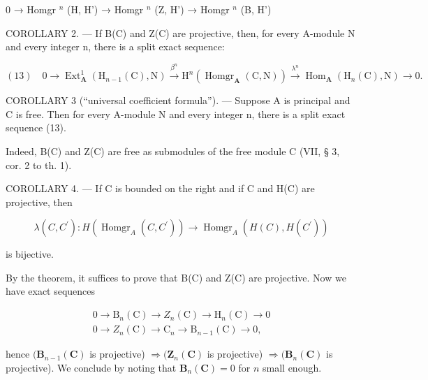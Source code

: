 0 → Homgr \(^{n}\) (H, H') → Homgr \(^{n}\) (Z, H') → Homgr \(^{n}\) (B, H')

COROLLARY 2. --- If B(C) and Z(C) are projective, then, for every A-module N and every integer n, there is a split exact sequence:

\[
(1 3) \quad 0 \longrightarrow \operatorname{Ext} _ {\mathbf {A}} ^ {1} \left(\mathrm{H} _ {n - 1} (\mathrm{C}), \mathrm{N}\right) \xrightarrow {\beta^ {n}} \mathrm{H} ^ {n} \left(\operatorname{Homgr} _ {\mathbf {A}} (\mathrm{C}, \mathrm{N})\right) \xrightarrow {\lambda^ {n}} \operatorname{Hom} _ {\mathbf {A}} \left(\mathrm{H} _ {n} (\mathrm{C}), \mathrm{N}\right) \longrightarrow 0.
\]

COROLLARY 3 (“universal coefficient formula”). --- Suppose A is principal and C is free. Then for every A-module N and every integer n, there is a split exact sequence (13).

Indeed, B(C) and Z(C) are free as submodules of the free module C (VII, § 3, cor. 2 to th. 1).

COROLLARY 4. --- If C is bounded on the right and if C and H(C) are projective, then

\[
\lambda (C, C ^ {\prime}): H \left(\operatorname{Homgr} _ {A} (C, C ^ {\prime})\right)\rightarrow \operatorname{Homgr} _ {A} \left(H (C), H \left(C ^ {\prime}\right)\right)
\]

is bijective.

By the theorem, it suffices to prove that B(C) and Z(C) are projective. Now we have exact sequences

\[
\begin{array}{l} 0 \to \mathrm{B} _ {n} (\mathrm{C}) \to Z _ {n} (\mathrm{C}) \to \mathrm{H} _ {n} (\mathrm{C}) \to 0 \\ 0 \to Z _ {n} (\mathrm{C}) \to \mathrm{C} _ {n} \to \mathrm{B} _ {n - 1} (\mathrm{C}) \to 0, \end{array}
\]

hence \((\mathbf{B}_{n - 1}(\mathbf{C})\) is projective) \(\Rightarrow (\mathbf{Z}_n(\mathbf{C})\) is projective) \(\Rightarrow (\mathbf{B}_n(\mathbf{C})\) is projective). We conclude by noting that \(\mathbf{B}_n(\mathbf{C}) = 0\) for \(n\) small enough.

